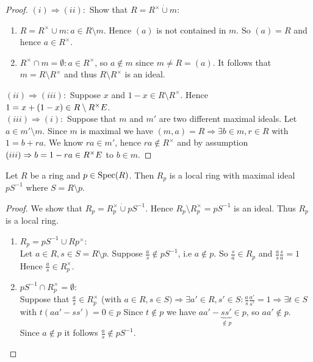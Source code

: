 \begin{proof}
$(i) \Rightarrow (ii):$ Show that $R=R^\times \dot{\cup} m:$
\begin{enumerate}[(1)]
\item $R=R^\times \cup m: a \in R\setminus m$. Hence $(a)$ is not contained in $m$. So $(a)=R$ and hence $a \in R^\times$.
\item $R^\times \cap m = \emptyset: a \in R^\times$, so $a \not\in m$ since $m \not = R=(a)$. It follows that $m=R \setminus R^\times$ and thus $R \setminus R^\times$ is an ideal.
\end{enumerate}
$(ii) \Rightarrow (iii):$ Suppose $x$ and $1-x \in R \setminus R^\times$. Hence $1=x+(1-x) \in R \setminus R^\times \Lightning$.\\
$(iii) \Rightarrow (i):$ Suppose that $m$ and $m'$ are two different maximal ideals. Let $a \in m' \setminus m$. Since $m$ is maximal we have $(m,a)=R \Rightarrow \exists b \in m, r\in R$ with $1=b+ra$. We know $ra \in m'$, hence $ra \not \in R^\times$ and by assumption $(iii) \Rightarrow b=1-ra \in R^\times \Lightning$ to $b \in m$.
\end{proof}

\begin{Prop}
Let $R$ be a ring and $p \in \operatorname{Spec}(R)$. Then $R_p$ is a local ring with maximal ideal $pS^{-1}$ where $S=R \setminus p$.
\end{Prop}

\begin{proof}
We show that $R_p=R_p^\times \dot \cup pS^{-1}$. Hence $R_p \setminus R_p^\times = pS^{-1}$ is an ideal. Thus $R_p$ is a local ring.
\begin{enumerate}[(1)]
\item $R_p=pS^{-1} \cup Rp^\times:$\\
Let $a \in R, s\in S=R\setminus p$. Suppose $\frac{a}{s} \not \in pS^{-1}$, i.e $a \not\in p$. So $\frac{s}{a} \in R_p$ and $\frac{a}{s}\frac{s}{a}=1$ Hence $\frac{a}{s} \in R_p^\times$.
\item $pS^{-1} \cap R_p^\times= \emptyset:$\\
Suppose that $\frac{a}{s} \in R_p^\times$ (with $a \in R, s \in S) \Rightarrow \exists a' \in R, s' \in S: \frac{a}{s}\frac{a'}{s'}=1 \Rightarrow \exists t \in S$ with $t(aa'-ss')=0 \in p$ Since $t \not \in p$ we have $aa'-\underbrace{ss'}_{\not\in p} \in p$, so $aa' \not\in p$. Since $a \not\in p$ it follows $\frac{a}{s} \not \in pS^{-1}$.
\end{enumerate}
\end{proof}

